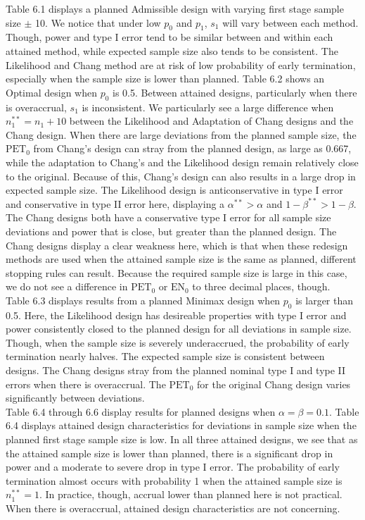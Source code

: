 \documentclass[12pt]{report}\usepackage[]{graphicx}\usepackage[]{color}
\newlength{\li}\setlength{\li}{14.48pt}
\newlength{\di}\setlength{\di}{-3.5mm}
\begin{document}
\indent Table 6.1 displays a planned Admissible design with varying first stage sample size $\pm$ 10. We notice that under low $p_0$ and $p_1$, $s_1$ will vary between each method. Though, power and type I error tend to be similar between and within each attained method, while expected sample size also tends to be consistent. The Likelihood and Chang method are at risk of low probability of early termination, especially when the sample size is lower than planned. Table 6.2 shows an Optimal design when $p_0$ is 0.5. Between attained designs, particularly when there is overaccrual, $s_1$ is inconsistent. We particularly see a large difference when $n_1^{\ast\ast} = n_1 + 10$ between the Likelihood and Adaptation of Chang designs and the Chang design. When there are large deviations from the planned sample size, the $\mbox{PET}_0$ from Chang's design can stray from the planned design, as large as 0.667, while the adaptation to Chang's and the Likelihood design remain relatively close to the original. Because of this, Chang's design can also results in a large drop in expected sample size. The Likelihood design is anticonservative in type I error and conservative in type II error here, displaying a $\alpha^{\ast\ast} > \alpha$ and $1-\beta^{\ast\ast} > 1-\beta$. The Chang designs both have a conservative type I error for all sample size deviations and power that is close, but greater than the planned design. The Chang designs display a clear weakness here, which is that when these redesign methods are used when the attained sample size is the same as planned, different stopping rules can result. Because the required sample size is large in this case, we do not see a difference in $\mbox{PET}_0$ or $\mbox{EN}_0$ to three decimal places, though.\\
\indent Table 6.3 displays results from a planned Minimax design when $p_0$ is larger than 0.5. Here, the Likelihood design has desireable properties with type I error and power consistently closed to the planned design for all deviations in sample size. Though, when the sample size is severely underaccrued, the probability of early termination nearly halves. The expected sample size is consistent between designs. The Chang designs stray from the planned nominal type I and type II errors when there is overaccrual. The $\mbox{PET}_0$ for the original Chang design varies significantly between deviations. \\
\indent Table 6.4 through 6.6 display results for planned designs when $\alpha = \beta = 0.1$. Table 6.4 displays attained design characteristics for deviations in sample size when the planned first stage sample size is low. In all three attained designs, we see that as the attained sample size is lower than planned, there is a significant drop in power and a moderate to severe drop in type I error. The probability of early termination almost occurs with probability 1 when the attained sample size is $n_1^{\ast\ast} = 1$. In practice, though, accrual lower than planned here is not practical. When there is overaccrual, attained design characteristics are not concerning. 
\end{document}
